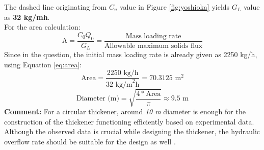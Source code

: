 \documentclass[a4paper]{article}
\begin{document}
The dashed line originating from $C_u$ value in Figure \ref{fig:yoshioka} yields $G_L$ value as \textbf{32 kg/mh}.\\
For the area calculation:
\begin{equation}
    \text{A} = \frac{C_0Q_0}{G_L} =\frac{\text {Mass loading rate}}{\text {Allowable maximum solids flux}}
    \label{eq:area}
\end{equation}
Since in the question, the initial mass loading rate is already given as 2250 kg/h, using Equation \ref{eq:area}:
$$\text{Area} = \frac{2250 \text{ kg/h} }{32 \text{ kg/m}^2\text{h}} = 70.3125 \text{ m}^2 $$
$$\text{Diameter (m)} = \sqrt{\frac{4*\text{Area}}{\pi}} \approx \boxed{9.5 \text{ m}} $$
\textbf{Comment:} For a circular thickener, around \emph{10 m} diameter is enough for the construction of the thickener functioning efficiently based on experimental data. Although the observed data is crucial while designing the thickener, the hydraulic overflow rate should be suitable for the design as well \autocite{metcalf2014}.
\end{document}
